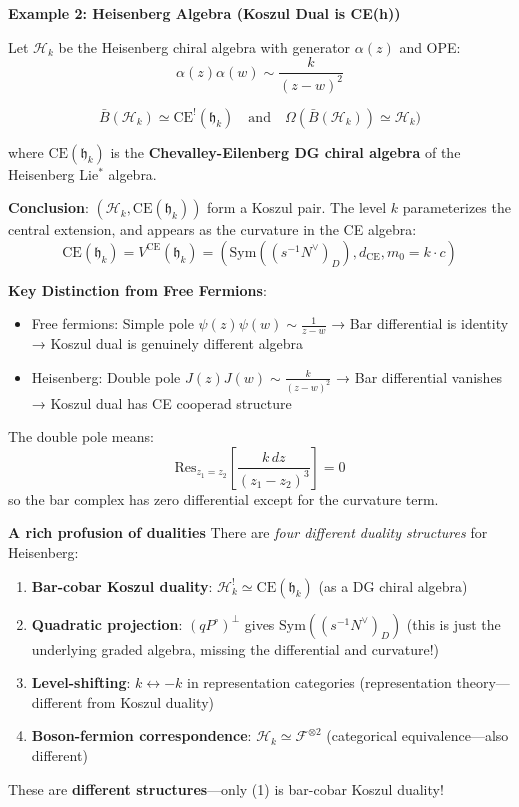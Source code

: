 \textbf{Example 2: Heisenberg Algebra (Koszul Dual is CE(h))}

Let $\mathcal{H}_k$ be the Heisenberg chiral algebra with generator $\alpha(z)$ and OPE:
$$\alpha(z)\alpha(w) \sim \frac{k}{(z-w)^2}$$
 
$$\bar{B}(\mathcal{H}_k) \simeq \text{CE}^!(\mathfrak{h}_k) \quad \text{and} \quad 
  \Omega(\bar{B}(\mathcal{H}_k)) \simeq \mathcal{H}_k)$$

where $\text{CE}(\mathfrak{h}_k)$ is the \textbf{Chevalley-Eilenberg DG chiral algebra} of the Heisenberg Lie$^*$ algebra.

\textbf{Conclusion}: $(\mathcal{H}_k, \text{CE}(\mathfrak{h}_k))$ form a Koszul pair. The level $k$ 
parameterizes the central extension, and appears as the curvature in the CE algebra:
$$\text{CE}(\mathfrak{h}_k) = V^{\text{CE}}(\mathfrak{h}_k) = (\text{Sym}((s^{-1}N^\vee)_D), d_{\text{CE}}, m_0 = k \cdot c)$$

\textbf{Key Distinction from Free Fermions}:
\begin{itemize}
\item Free fermions: Simple pole $\psi(z)\psi(w) \sim \frac{1}{z-w}$ → Bar differential is identity → Koszul dual is genuinely different algebra
\item Heisenberg: Double pole $J(z)J(w) \sim \frac{k}{(z-w)^2}$ → Bar differential vanishes → Koszul dual has CE cooperad structure
\end{itemize}

The double pole means:
$$\text{Res}_{z_1=z_2}\left[\frac{k \, dz}{(z_1-z_2)^3}\right] = 0$$
so the bar complex has zero differential except for the curvature term.

\textbf{A rich profusion of dualities} There are \emph{four different duality structures} for Heisenberg:
\begin{enumerate}
\item \textbf{Bar-cobar Koszul duality}: $\mathcal{H}_k^! \simeq \text{CE}(\mathfrak{h}_k)$ 
      (as a DG chiral algebra)
\item \textbf{Quadratic projection}: $(qP^\circ)^\perp$ gives $\text{Sym}((s^{-1}N^\vee)_D)$
      (this is just the underlying graded algebra, missing the differential and curvature!)
\item \textbf{Level-shifting}: $k \leftrightarrow -k$ in representation categories 
      (representation theory—different from Koszul duality)
\item \textbf{Boson-fermion correspondence}: $\mathcal{H}_k \simeq \mathcal{F}^{\otimes 2}$ 
      (categorical equivalence—also different)
\end{enumerate}
These are \textbf{different structures}—only (1) is bar-cobar Koszul duality!


